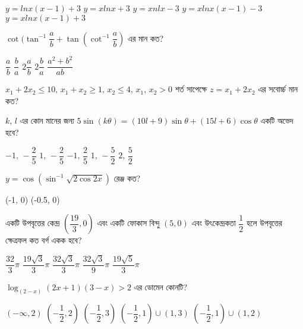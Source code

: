 \documentclass[addpoints]{exam}
\begin{document}
\begin{questions}
\begin{oneparchoices}
\choice $ y = lnx(x-1) + 3 $
\choice $ y = xlnx +3 $ 
\choice $ y = xnlx -3  $
\choice $ y = xlnx(x-1) - 3 $
\choice $ y = xlnx(x-1) + 3 $
\end{oneparchoices}

\question  $ \cot(\tan^{-1}\dfrac{a}{b} + \tan(\cot^{-1}\dfrac{a}{b}) $ এর মান কত?

\begin{oneparchoices}
\choice $ \dfrac{a}{b} $
\choice  $ \dfrac{b}{a} $
\choice $ 2\dfrac{a}{b} $
\choice $ 2\dfrac{b}{a} $
\choice $ \dfrac{a^{2}+b^{2}}{ab} $
\end{oneparchoices}

\question $ x_{1}+2x_{2}\le 10,\,x_{1}+x_{2}\ge 1,\, x_{2}\le 4,\, x_{1},\,x_{2}>0 $  শর্ত সাপেক্ষে $ z= x_{1}+2x_{2} $ এর সবোর্চ্চ মান কত?

\begin{oneparchoices}
\end{oneparchoices}

\question $ k,\, l $ এর কোন মানের জন্য $ 5\sin(k\theta) = (10l+9)\sin\theta + (15l+6)\cos\theta $ একটি অভেদ হবে?

\begin{oneparchoices}
\choice $ -1,\,-\dfrac{2}{5} $
\choice $ 1,\,-\dfrac{2}{5} $
\choice $ -1,\,\dfrac{2}{5} $
\choice $ 1,\,-\dfrac{5}{2} $
\choice $ 2,\,\dfrac{5}{2} $
\end{oneparchoices}

\question  $ y= \cos(\sin^{-1}\sqrt{2\cos 2x}) $ রেঞ্জ কত?

\begin{oneparchoices}
\choice (-1, 0)
\choice [-1, 0]
\choice [0, 1]
\choice (-0.5, 0)
\choice [-0.5, 0]
\end{oneparchoices}

\question  একটি উপবৃত্তের কেন্দ্র $ (\dfrac{19}{3}, 0) $ এবং একটি ফোকাস বিন্দু $ (5,0) $ এবং উৎকেন্দ্রকতা $ \dfrac{1}{2} $ হলে উপবৃত্তের ক্ষেত্রফল কত বর্গ একক হবে?

\begin{oneparchoices}
\choice $ \dfrac{32}{3}\pi $
\choice $ \dfrac{19\sqrt{3}}{3}\pi $
\choice $ \dfrac{32\sqrt{3}}{3}\pi $
\choice $ \dfrac{32\sqrt{3}}{9}\pi $
\choice $ \dfrac{19\sqrt{5}}{3}\pi $
\end{oneparchoices}

\question  $ \log_{(2-x)} (2x+1)(3-x) > 2$ এর ডোমেন কোনটি?

\begin{oneparchoices}
\choice $ (-\infty, 2) $
\choice $ (-\dfrac{1}{2}, 2) $ 
\choice $ (-\dfrac{1}{2}, 3) $ 
\choice $ (-\dfrac{1}{2}, 1)\cup (1,3) $ 
\choice $ (-\dfrac{1}{2}, 1)\cup (1,2) $ 
\end{oneparchoices}


\end{questions}
\end{document}
